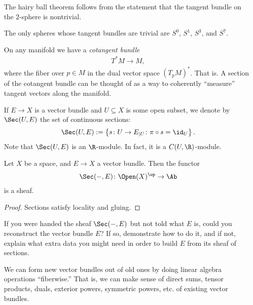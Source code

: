 \documentclass[11pt]{book}
\begin{document}
\begin{example} The hairy ball theorem follows from the statement that the tangent bundle on the $2$-sphere is nontrivial.
\end{example}

\begin{theorem} The only spheres whose tangent bundles are trivial are $S^0$, $S^1$, $S^3$, and $S^7$.
\end{theorem}

\begin{example} On any manifold we have a \emph{cotangent bundle}
\begin{align*}
    T^\ast M \to M,
\end{align*}
where the fiber over $p\in M$ in the dual vector space $(T_p M)^\ast$. That is. A section of the cotangent bundle can be thought of as a way to coherently ``measure'' tangent vectors along the manifold.
\end{example}

\begin{notation} If $E\to X$ is a vector bundle and $U \subseteq X$ is some open subset, we denote by $\Sec(U,E)$ the set of continuous sections:
\begin{align*}
    \Sec(U,E) := \left\{ s \colon U \to E_{|U} \colon \pi\circ s = \id_U \right\}.
\end{align*}
Note that $\Sec(U,E)$ is an $\R$-module. In fact, it is a $C(U,\R)$-module.
\end{notation}

\begin{proposition} Let $X$ be a space, and $E \to X$ a vector bundle. Then the functor
\begin{align*}
    \Sec(-,E) \colon \Open(X)^\op \to \Ab
\end{align*}
is a sheaf.
\end{proposition}
\begin{proof} Sections satisfy locality and gluing. 
\end{proof}

\begin{question} If you were handed the sheaf $\Sec(-,E)$ but not told what $E$ is, could you reconstruct the vector bundle $E$? If so, demonstrate how to do it, and if not, explain what extra data you might need in order to build $E$ from its sheaf of sections.
\end{question}

\begin{remark} We can form new vector bundles out of old ones by doing linear algebra operations ``fiberwise.'' That is, we can make sense of direct sums, tensor products, duals, exterior powers, symmetric powers, etc. of existing vector bundles.
\end{remark}
\end{document}
